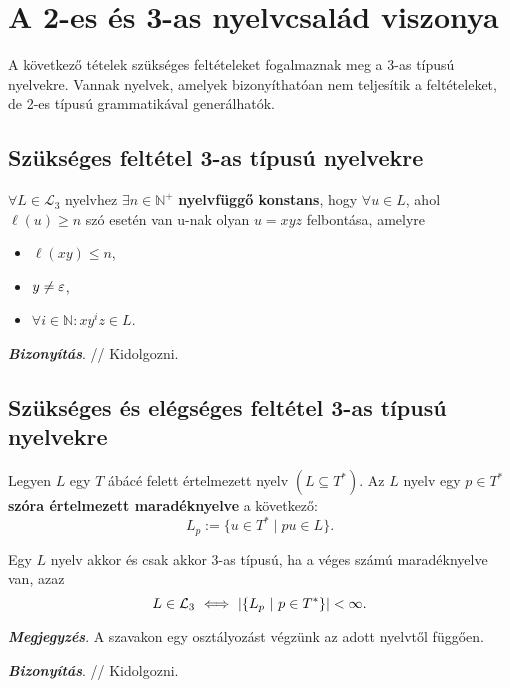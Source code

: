 \chapter{A 2-es és 3-as nyelvcsalád viszonya}

A következő tételek szükséges feltételeket fogalmaznak meg a 3-as típusú
nyelvekre. Vannak nyelvek, amelyek bizonyíthatóan nem teljesítik a feltételeket,
de 2-es típusú grammatikával generálhatók.

\section{Szükséges feltétel 3-as típusú nyelvekre}

\begin{tcolorbox}
	\begin{lemma}
		$\forall L \in \mathcal{L}_3$ nyelvhez $\exists n \in \mathbb{N}^+$ \textbf{nyelvfüggő
		konstans}, hogy $\forall u \in L$, ahol $\ell(u) \geq n$ szó esetén van
		u-nak olyan $u = xyz$ felbontása, amelyre
		\begin{itemize}
			\item $\ell(xy) \leq n$,
			\item $y \neq \varepsilon$,
			\item $\forall i \in \mathbb{N} : xy^iz \in L$.
		\end{itemize}
	\end{lemma}
\end{tcolorbox}

\textbf{\textit{Bizonyítás}}. // Kidolgozni.

\section{Szükséges és elégséges feltétel 3-as típusú nyelvekre}

\begin{tcolorbox}
	\begin{definition}[Maradéknyelv]
		Legyen $L$ egy $T$ ábácé felett értelmezett nyelv $(L \subseteq T^*)$.
		Az $L$ nyelv egy $p \in T^*$ \textbf{szóra értelmezett maradéknyelve} a következő:
		\[ L_p := \{ u \in T^* \mid pu \in L \} . \]
	\end{definition}
\end{tcolorbox}

\begin{tcolorbox}
	\begin{theorem}
		Egy $L$ nyelv akkor és csak akkor 3-as típusú, ha a véges számú maradéknyelve van, azaz
		\[ L \in \mathcal{L}_3 ~ \Longleftrightarrow ~ \left| \left\{ L_p ~ \middle\vert ~ p \in T^* \right\} \right| < \infty . \]
	\end{theorem}
\end{tcolorbox}

\textbf{\textit{Megjegyzés}}. A szavakon egy osztályozást végzünk az
adott nyelvtől függően.

\textbf{\textit{Bizonyítás}}. // Kidolgozni.

